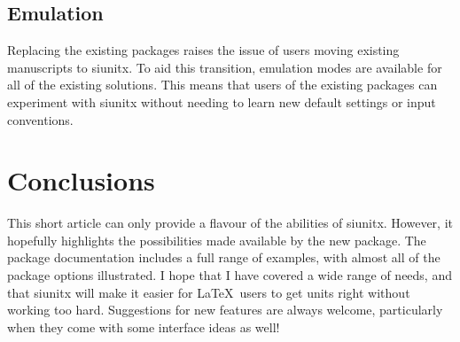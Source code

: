 \documentclass{article}
\providecommand*\pkg[1]{\textsf{#1}}
\begin{document}
\subsection{Emulation}

Replacing the existing packages raises the issue of users
moving existing manuscripts to \pkg{siunitx}.  To aid this
transition, emulation modes are available for all of the
existing solutions.  This means that users of the existing
packages can experiment with \pkg{siunitx} without needing to
learn new default settings or input conventions.

\section{Conclusions}

This short article can only provide a flavour of the abilities
of \pkg{siunitx}.  However, it hopefully highlights the
possibilities made available by the new package.  The package
documentation includes a full range of examples, with almost
all of the package options illustrated.  I hope that I have
covered a wide range of needs, and that \pkg{siunitx} will make
it easier for \LaTeX\ users to get units right without working
too hard.  Suggestions for new features are always welcome,
particularly when they come with some interface ideas as well!



\end{document}
